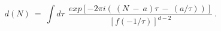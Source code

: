 \begin{equation} 
d(N) ~=~ \int d\tau ~~\frac{exp\left[-2 \pi i \left(~(N~-~a) \tau ~-~
(a/\tau)\right)\right]}{\left[f(-{1}/{\tau})\right]^{d-2}} ~.
\end{equation}

